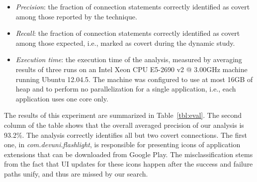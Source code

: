 \begin{itemize}[leftmargin=0.5cm]%
\item \emph{Precision}: the fraction of connection statements correctly identified as covert among those reported by the technique.
\item \emph{Recall}: the fraction of connection statements correctly identified as covert among those expected, i.e., marked as covert during the dynamic study. 
\item \emph{Execution time}: the execution time of the analysis, measured by averaging results of
three runs on an Intel\textsuperscript{\textregistered} Xeon\textsuperscript{\textregistered} CPU E5-2690 v2 @ 3.00GHz machine running Ubuntu 12.04.5. The machine was configured to use at most 16GB of heap and to perform no parallelization for a single application, i.e., each application uses one core only.
\end{itemize}
  
The results of this experiment are summarized in Table~\ref{tbl:eval}.  
The second column of the table shows that the overall averaged precision of our analysis is 93.2\%. 
The analysis correctly identifies all but two covert connections. 
The first one, in \emph{com.devuni.flashlight}, is responsible for presenting icons of application extensions that can be downloaded from Google Play. The misclassification stems from the fact that UI updates for these icons happen after the success and failure paths unify, and thus are missed by our search. 

